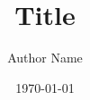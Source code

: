 \documentclass{uhlvb}
\title{Title}
\author{Author Name}
\date{\today}
\begin{document}
\lipsum
\end{document}
